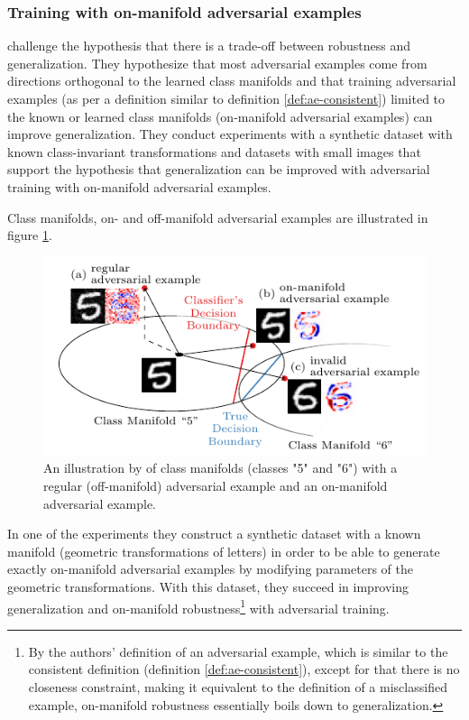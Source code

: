 \documentclass[twocolumn]{article}
\begin{document}
\subsubsection{Training with on-manifold adversarial examples}

\citet{Stutz:2018:DARG} challenge the hypothesis that there is a trade-off between robustness and generalization. They hypothesize that most adversarial examples come from directions orthogonal to the learned class manifolds and that training adversarial examples (as per a definition similar to definition \ref{def:ae-consistent}) limited to the known or learned class manifolds (on-manifold adversarial examples) can improve generalization. They conduct experiments with a synthetic dataset with known class-invariant transformations and datasets with small images that support the hypothesis that generalization can be improved with adversarial training with on-manifold adversarial examples.

Class manifolds, on- and off-manifold adversarial examples are illustrated in figure \ref{fig:stutz-illustration}.

\begin{figure}
	\begin{center}
		\includegraphics[width=\columnwidth]{figures/adversarial-examples/stutz-introduction_b.pdf}
	\end{center}
	\caption{An illustration by \citet{Stutz:2018:DARG} of class manifolds (classes "5" and "6") with a regular (off-manifold) adversarial example and an on-manifold adversarial example.}
	\label{fig:stutz-illustration}
\end{figure}

In one of the experiments they construct a synthetic dataset with a known manifold (geometric transformations of letters) in order to be able to generate exactly on-manifold adversarial examples by modifying parameters of the geometric transformations. With this dataset, they succeed in improving generalization and on-manifold robustness\footnote{By the authors' definition of an adversarial example, which is similar to the consistent definition (definition \ref{def:ae-consistent}), except for that there is no closeness constraint, making it equivalent to the definition of a misclassified example, on-manifold robustness essentially boils down to generalization.} with adversarial training.
\end{document}
